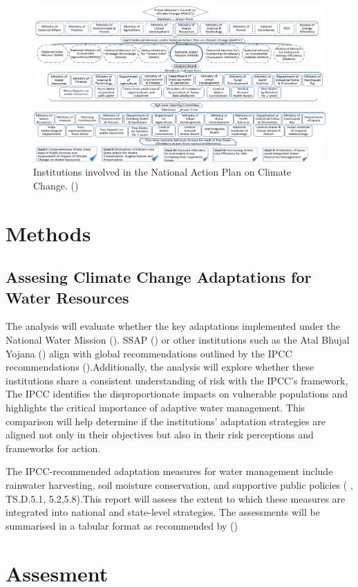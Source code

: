 \documentclass[12pt]{article}
\begin{document}
\begin{figure}[h]
  \centering
  \includegraphics[width = \textwidth]{NAPCC_india.jpg}
  \caption{Institutions involved in the National Action Plan on Climate Change. (\cite{azohani_2017})}
\end{figure}




\section*{Methods}
\subsection*{Assesing Climate Change Adaptations for Water Resources}
The analysis will evaluate whether the key adaptations implemented under the National Water Mission (\cite{napcc_2008}).
SSAP (\cite{SSAP_2015}) or other institutions such as the Atal Bhujal Yojana (\cite{nandakumaran_2020}) align with 
global recommendations outlined by the IPCC recommendations (\cite{ipcc_climate_2023}).Additionally, the analysis will 
explore whether these institutions share a consistent understanding of risk with the IPCC’s framework, The IPCC identifies 
the disproportionate impacts on vulnerable populations and highlights the critical importance of adaptive water management. 
This comparison will help determine if the institutions' adaptation strategies are aligned not only in their objectives but 
also in their risk perceptions and frameworks for action.

The IPCC-recommended adaptation measures for water management include rainwater harvesting, soil moisture conservation, 
and supportive public policies (\cite{ipcc_climate_2023} , TS.D.5.1, 5.2,5.8).This report will assess the extent to 
which these measures are integrated into national and state-level strategies. The assessments will be summarised in 
a tabular format as recommended by (\cite{craft_2016})



\section*{Assesment}
\end{document}
